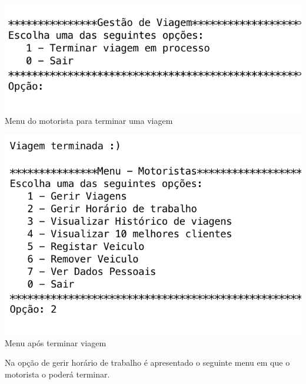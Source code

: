\hfill
\noindent\begin{minipage}[b]{.4\textwidth}
	\includegraphics[scale=0.55]{imagem/gerirViagem}
	\small{Menu do motorista para terminar uma viagem}
\end{minipage} 
\hfill
\begin{minipage}[b]{.4\textwidth}
	\includegraphics[scale=0.5]{imagem/viagemTerminada}
	\small{Menu após terminar viagem}
\end{minipage}
\hfill 

Na opção de gerir horário de trabalho é apresentado o seguinte menu em que o motorista o poderá terminar. 

